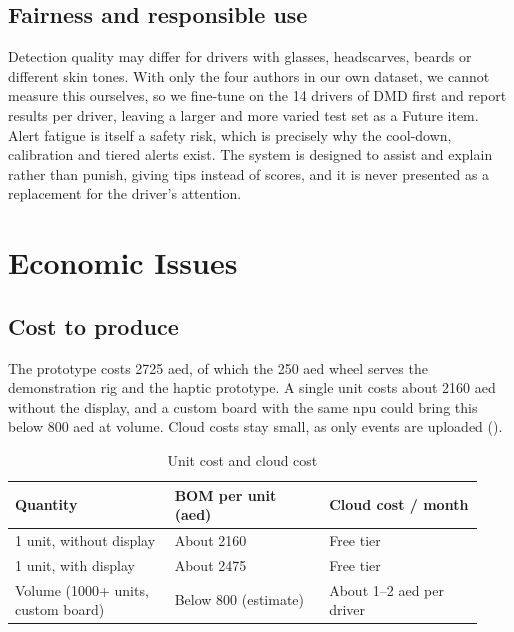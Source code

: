 \subsection{Fairness and responsible use}

Detection quality may differ for drivers with glasses, headscarves, beards or different skin tones. With only the four authors in our own dataset, we cannot measure this ourselves, so we fine-tune on the 14 drivers of DMD first and report results per driver, leaving a larger and more varied test set as a Future item. Alert fatigue is itself a safety risk, which is precisely why the cool-down, calibration and tiered alerts exist. The system is designed to assist and explain rather than punish, giving tips instead of scores, and it is never presented as a replacement for the driver's attention.

\section{Economic Issues}
\subsection{Cost to produce}

The prototype costs 2725 \gls{aed}, of which the 250 \gls{aed} wheel serves the demonstration rig and the haptic prototype. A single unit costs about 2160 \gls{aed} without the display, and a custom board with the same \gls{npu} could bring this below 800 \gls{aed} at volume. Cloud costs stay small, as only events are uploaded ().

\begin{table}[htbp]
\centering
\caption{Unit cost and cloud cost}
\label{tab:ch4-19}
\footnotesize
\setlength{\tabcolsep}{3pt}
\renewcommand{\arraystretch}{1.15}
\begin{tabular}{|p{0.316\linewidth}|p{0.307\linewidth}|p{0.307\linewidth}|}
\hline
\textbf{Quantity} & \textbf{BOM per unit (\gls{aed})} & \textbf{Cloud cost / month} \\
\hline
1 unit, without display & About 2160 & Free tier \\
\hline
1 unit, with display & About 2475 & Free tier \\
\hline
Volume (1000+ units, custom board) & Below 800 (estimate) & About 1--2 \gls{aed} per driver \\
\hline
\end{tabular}
\end{table}

